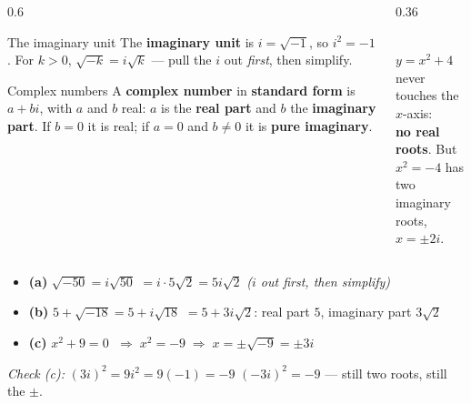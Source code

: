 \documentclass[aspectratio=169, 11pt]{beamer}
\newcommand{\lgrid}[4]{%
  \draw[step=1, linegray!45, thin] (#1,#3) grid (#2,#4);
  \draw[->, thick, charcoal] (#1,0)--(#2,0) node[below right, font=\tiny]{$x$};
  \draw[->, thick, charcoal] (0,#3)--(0,#4) node[left, font=\tiny]{$y$};}
\begin{document}
\begin{frame}[t, plain]
  \begin{columns}[T]
    \begin{column}{0.6\textwidth}
      \begin{block}{The imaginary unit}
        The \textbf{imaginary unit} is $i=\sqrt{-1}$, so $i^2=-1$. For $k>0$,
        $\sqrt{-k}=i\sqrt{k}$ --- pull the $i$ out \emph{first}, then simplify.
      \end{block}
      \vspace{2pt}
      \begin{block}{Complex numbers}
        A \textbf{complex number} in \textbf{standard form} is $a+bi$, with $a$ and $b$ real:
        $a$ is the \textbf{real part} and $b$ the \textbf{imaginary part}. If $b=0$ it is real;
        if $a=0$ and $b\ne0$ it is \textbf{pure imaginary}.
      \end{block}
    \end{column}
    \begin{column}{0.36\textwidth}
      \centering
      \\[-2pt]
      {\scriptsize $y=x^2+4$ never touches the $x$-axis: \\ \textbf{no real roots}. But
      $x^2=-4$ has two \\ imaginary roots, $x=\pm2i$.}
    \end{column}
  \end{columns}
\end{frame}

\begin{frame}[t, plain]
  \begin{itemize}\setlength{\itemsep}{8pt}
    \item \textbf{(a)} $\sqrt{-50}=i\sqrt{50}$ \pause $=i\cdot5\sqrt2=5i\sqrt2$ \quad
          \emph{($i$ out first, then simplify)}
    \pause
    \item \textbf{(b)} $5+\sqrt{-18}=5+i\sqrt{18}$ \pause $=5+3i\sqrt2$: \; real part $5$,
          imaginary part $3\sqrt2$
    \pause
    \item \textbf{(c)} $x^2+9=0$ \pause $\;\Rightarrow\; x^2=-9 \;\Rightarrow\;
          x=\pm\sqrt{-9}=\pm3i$
  \end{itemize}
  \pause
  \vspace{4pt}
  \emph{Check (c):} $(3i)^2=9i^2=9(-1)=-9$ \checkmark \quad $(-3i)^2=-9$ \checkmark \quad ---
  still two roots, still the $\pm$.
\end{frame}
\end{document}
